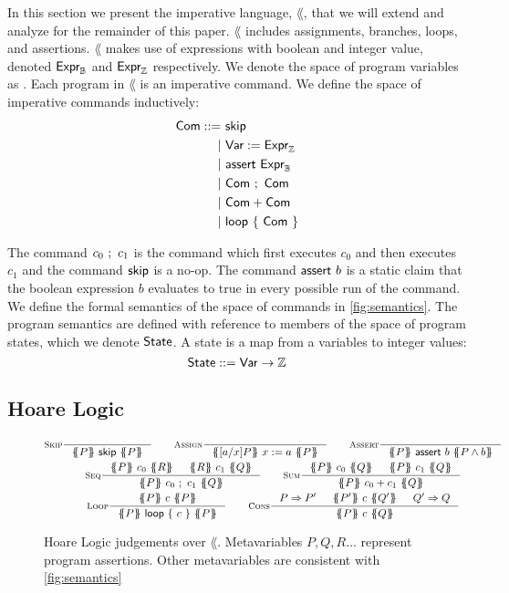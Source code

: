 \documentclass[p.tex]{subfiles}
\begin{document}
In this section we present the imperative language, $\lang$, that we will extend
and analyze for the remainder of this paper.
$\lang$ includes
assignments, branches, loops, and assertions.
%
$\lang$ makes use of expressions with boolean and integer
value, denoted $\textsf{Expr}_{\mathbb{B}}$ and $\textsf{Expr}_{\mathbb{Z}}$ respectively.
%
We denote the space of program variables as \var.
%
Each program in $\lang$ is an imperative command.
We define the space of imperative commands inductively:
\begin{align*}
  \textsf{Com} ::=&~\textsf{skip}\\
         |&~\textsf{Var}:= \textsf{Expr}_{\mathbb{Z}}\\
         |&~\textsf{assert}~\textsf{Expr}_{\mathbb{B}}\\
         |&~\textsf{Com}~;~\textsf{Com}\\
         |&~\textsf{Com} + \textsf{Com}\\
         |&~\textsf{loop}~\{~\textsf{Com}~\}
\end{align*}

The command $c_0~;~c_1$ is the command which first executes
$c_0$ and then executes $c_1$ and the command $\textsf{skip}$ is a no-op. The
command $\textsf{assert}~b$ is a static claim that the boolean expression
$b$ evaluates to true in every possible run of the command. We define
the formal semantics of the space of commands in \cref{fig:semantics}.
%
The program semantics are defined with reference to members of the
space of program states, which we denote $\textsf{State}$. A state
is a map from a variables to integer values:
%
\[\textsf{State} ::= \textsf{Var} \rightarrow \mathbb{Z}\]

\subsection{Hoare Logic}
\begin{figure}
\begin{spreadlines}{5pt}
\begin{gather*}
  \inference[\textsc{Skip}]{%
  }{%
    \hoare{P}{\cskip}{P}
  }
  \qquad
  \inference[\textsc{Assign}]{%
  }{%
    \hoare{\subst{x}{a}{P}}{\cassign{x}{a}}{P}
  }
  \qquad
  \inference[\textsc{Assert}]{%
  }{%
    \hoare{P}{\cassert{b}}{P \land b}
  }
  \\
  \inference[\textsc{Seq}]{%
    \hoare{P}{c_0}{R}&
    \hoare{R}{c_1}{Q}
  }{%
    \hoare{P}{\cseq{c_0}{c_1}}{Q}
  }
  \qquad
  \inference[\textsc{Sum}]{%
    \hoare{P}{c_0}{Q}&
    \hoare{P}{c_1}{Q}
  }{%
    \hoare{P}{\csum{c_0}{c_1}}{Q}
  }
  \\
  \inference[\textsc{Loop}]{%
    \hoare{P}{c}{P}
  }{%
    \hoare{P}{\cloop{c}}{P}
  }
  \qquad
  \inference[\textsc{Cons}]{%
    P \Rightarrow P'&
    \hoare{P'}{c}{Q'}&
    Q' \Rightarrow Q
  }{%
    \hoare{P}{c}{Q}
  }
  \end{gather*}
\end{spreadlines}
\caption{%
  Hoare Logic judgements over $\lang$.
  Metavariables $P, Q, R\ldots$ represent program
  assertions. Other metavariables are consistent with
  \cref{fig:semantics}
}\label{fig:base-proof-system}
\end{figure}
\end{document}
